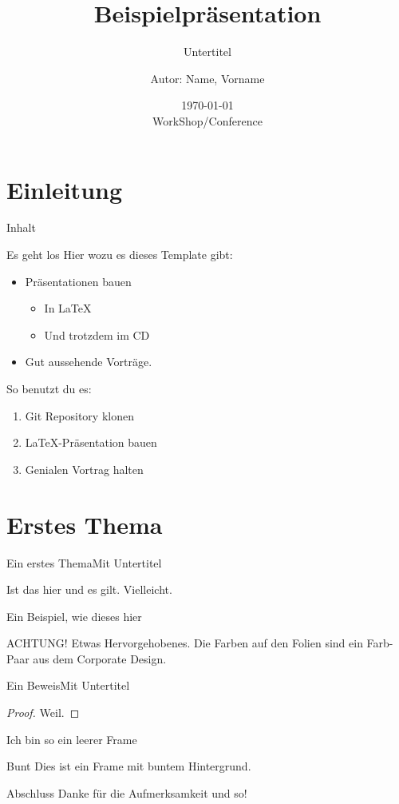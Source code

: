 \documentclass[german,10pt,xcolor=colortbl,compress,aspectratio=169
]{beamer}
\title{Beispielpräsentation}
\subtitle{Untertitel}
\date[]{\today\\[1ex] WorkShop/Conference}
\author[Autor in Fußzeile]{Autor: Name, Vorname}
\institute[]{AG xy\\FB ab\\RPTU in Kaiserslautern}
\begin{document}
\maketitle
\section{Einleitung}
\begin{frame}{Inhalt}
	\tableofcontents
\end{frame}
\begin{frame}{Es geht los}
	Hier wozu es dieses Template gibt:
	\begin{itemize}
		\item Präsentationen bauen
		      \begin{itemize}
			      \item In \LaTeX
			      \item Und trotzdem im CD
		      \end{itemize}
		\item Gut aussehende Vorträge.
	\end{itemize}
	So benutzt du es:
	\begin{enumerate}
		\item Git Repository klonen
		\item \LaTeX-Präsentation bauen
		\item Genialen Vortrag halten
	\end{enumerate}
\end{frame}
\section{Erstes Thema}
\begin{frame}{Ein erstes Thema}{Mit Untertitel}
	\begin{lemma}
		Ist das hier und es gilt. Vielleicht.
	\end{lemma}
	\begin{example}
		Ein Beispiel, wie dieses hier
	\end{example}
	\alert{ACHTUNG!}
	Etwas Hervorgehobenes. Die Farben auf den Folien sind ein Farb-Paar aus dem Corporate Design.\\

\end{frame}
\begin{frame}{Ein Beweis}{Mit Untertitel}
	\begin{proof}
		Weil.
	\end{proof}
\end{frame}

\begin{frame}[plain]{}{}%
	Ich bin so ein leerer Frame
\end{frame}

\begin{frame}[coloredbackground]{Bunt}
	Dies ist ein Frame mit buntem Hintergrund.
\end{frame}
\begin{frame}{Abschluss}
	Danke für die Aufmerksamkeit und so!
\end{frame}
\end{document}
